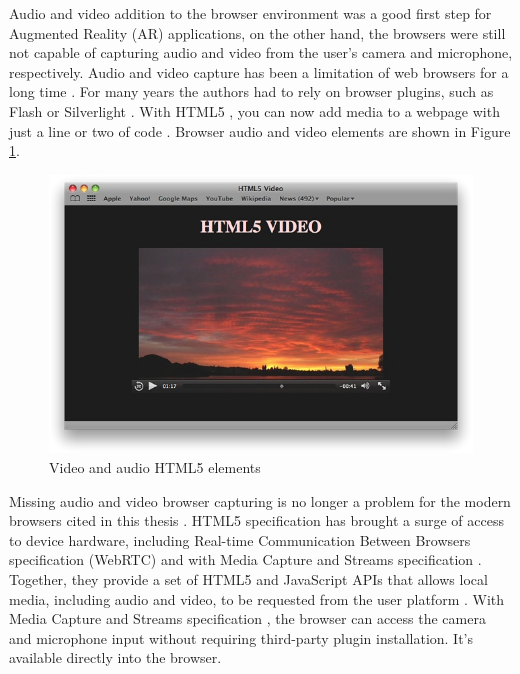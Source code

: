 Audio and video addition to the browser environment was a good first step for Augmented Reality (AR) applications, on the other hand, the browsers were still not capable of capturing audio and video from the user's camera and microphone, respectively. Audio and video capture has been a limitation of web browsers for a long time \cite{Hickson2013}. For many years the authors had to rely on browser plugins, such as Flash \cite{Flash2013} or Silverlight \cite{Silverlight2013} \cite{Rocks2013}. With HTML5 \cite{Hickson2013}, you can now add media to a webpage with just a line or two of code \cite{WebKit2013}. Browser audio and video elements \cite{Hickson2013} are shown in Figure \ref{figure:html5_audio_video}.

\begin{figure}[!htb]
  \centering
  \includegraphics[width=400pt]{chapters/basic_concepts/html5_audio_video.png}
  \caption{Video and audio HTML5 elements \cite{WebKit2013}}
  \label{figure:html5_audio_video}
\end{figure}

Missing audio and video browser capturing is no longer a problem for the modern browsers cited in this thesis \cite{WebRTC2013} \cite{Hickson2013}. HTML5 specification \cite{Hickson2013} has brought a surge of access to device hardware, including Real-time Communication Between Browsers specification (WebRTC) \cite{WebRTC2013} and with Media Capture and Streams specification \cite{MediaCapture2013}. Together, they provide a set of HTML5 \cite{Hickson2013} and JavaScript APIs \cite{WebRTC2013} that allows local media, including audio and video, to be requested from the user platform \cite{WC2006}. With Media Capture and Streams specification \cite{MediaCapture2013}, the browser can access the camera and microphone input without requiring third-party plugin installation. It's available directly into the browser.

